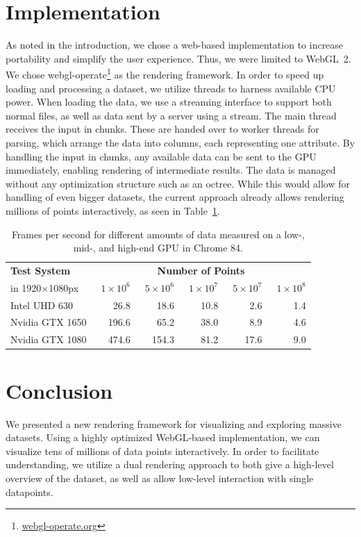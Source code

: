 \documentclass[sigconf]{acmart}
\begin{document}
\section{Implementation}

As noted in the introduction, we chose a web-based implementation to increase portability and simplify the user experience. Thus, we were limited to WebGL~2.
We chose webgl-operate\footnote{\href{https://webgl-operate.org/}{webgl-operate.org}} as the rendering framework.
In order to speed up loading and processing a dataset, we utilize threads to harness available CPU power.
When loading the data, we use a streaming interface to support both normal files, as well as data sent by a server using a stream.
The main thread receives the input in chunks.
These are handed over to worker threads for parsing, which arrange the data into columns, each representing one attribute.
By handling the input in chunks, any available data can be sent to the GPU immediately, enabling rendering of intermediate results.
The data is managed without any optimization structure such as an octree. While this would allow for handling of even bigger datasets, the current approach already allows rendering millions of points interactively, as seen in Table~\ref{tab:eval}.

\begin{table}[b]
    \renewcommand{\arraystretch}{0.95}
	\centering
	\small
	\noindent
	\caption{Frames per second for different amounts of data measured on a low-, mid-, and high-end GPU in Chrome 84.}%
	\vspace{-0.75\baselineskip}
	\label{tab:eval}
	\begin{tabularx}{\linewidth}{X|rrrrr}
		\toprule
		\hiderowcolors
		\textbf{Test System} & \multicolumn{5}{c}{\textbf{Number of Points}} \\
		in 1920$\times$1080px &\
		$1\times10^6$ &\
		$5\times10^6$ &\
		$1\times10^7$ &\
		$5\times10^7$ &\
		$1\times10^8$ \\
		\midrule
		\showrowcolors
		Intel UHD 630   &  26.8 &  18.6 &  10.8 &   2.6 &   1.4 \\
	    Nvidia GTX 1650 & 196.6 &  65.2 &  38.0 &   8.9 &   4.6 \\
		Nvidia GTX 1080 & 474.6 & 154.3 &  81.2 &  17.6 &   9.0 \\
		\bottomrule
	\end{tabularx}
\end{table}

\section{Conclusion}

We presented a new rendering framework for visualizing and exploring massive datasets. Using a highly optimized WebGL-based implementation, we can visualize tens of millions of data points interactively.
In order to facilitate understanding, we utilize a dual rendering approach to both give a high-level overview of the dataset, as well as allow low-level interaction with single datapoints.



\end{document}
